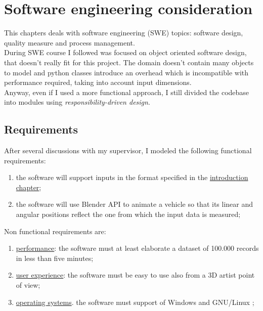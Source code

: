 \chapter{Software engineering consideration}
\label{chap:software_engineering_consideration}

This chapters deals with software engineering (SWE) topics: software design, quality measure and process management. \\
During SWE course I followed was focused on object oriented software design, that doesn't really fit for this project. The domain doesn't contain many objects to model and python classes introduce an overhead which is incompatible with performance required, taking into account input dimensions. \\
Anyway, even if I used a more functional approach, I still divided the codebase into modules using \textit{responsibility-driven design}.

\section{Requirements}
After several discussions with my supervisor, I modeled the following functional requirements:
\begin{enumerate}
\item the software will support inputs in the format specified in the \hyperref[chap:intro]{introduction chapter};
\item the software will use Blender API to animate a vehicle so that its linear and angular positions reflect the one from which the input data is measured;
\end{enumerate}
Non functional requirements are:
\begin{enumerate} 
\item \underline{performance}: the software must at least elaborate a dataset of 100.000 records in less than five minutes;
\item \underline{user experience}: the software must be easy to use also from a 3D artist point of view;
\item \underline{operating systems}. the software must support of Windows and GNU/Linux ;
\end{enumerate}

